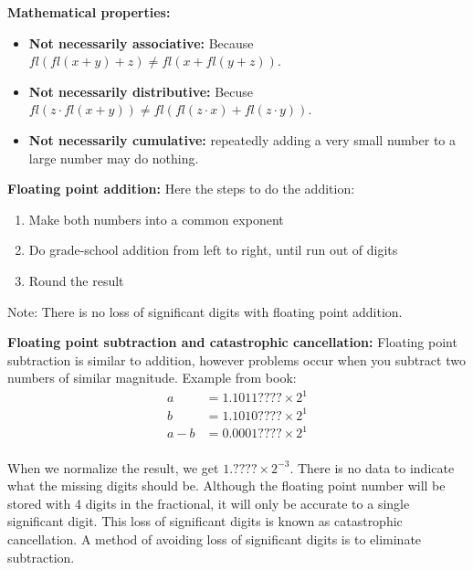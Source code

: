 \documentclass[12pt]{article}
\begin{document}
\medskip
\noindent \textbf{Mathematical properties:}
    \begin{itemize}
        \item \textbf{Not necessarily associative:} Because $fl(fl(x + y) + z) \neq fl(x + fl(y + z))$.
        \item \textbf{Not necessarily distributive:} Becuse $fl(z \cdot fl(x + y)) \neq fl(fl(z \cdot x) + fl(z \cdot y))$.
        \item \textbf{Not necessarily cumulative:} repeatedly adding a very small number to a large number may do nothing.
    \end{itemize}

\medskip
\noindent \textbf{Floating point addition:} Here the steps to do the addition:
    \begin{enumerate}
        \item Make both numbers into a common exponent
        \item Do grade-school addition from left to right, until run out of digits
        \item Round the result
    \end{enumerate}
    Note: There is no loss of significant digits with floating point addition.
    
\newpage
\noindent \textbf{Floating point subtraction and catastrophic cancellation:} Floating point subtraction is similar to addition, however problems occur when you subtract two numbers of similar magnitude. Example from book:
    \begin{align*} a &= 1.1011???? \times 2^1 \\ b &= 1.1010???? \times 2^1 \\ a - b &= 0.0001???? \times 2^1 \\ \end{align*}
    
    When we normalize the result, we get $1.???? \times 2^{-3}$. There is no data to indicate what the missing digits should be. Although the floating point number will be stored with 4 digits in the fractional, it will only be accurate to a single significant digit. This loss of significant digits is known as catastrophic cancellation. A method of avoiding loss of significant digits is to eliminate subtraction.
    
\end{document}

